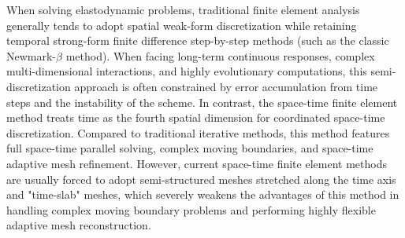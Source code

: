 \begin{abstractEn}
    When solving elastodynamic problems, traditional finite element analysis generally tends to adopt spatial weak-form discretization while retaining temporal strong-form finite difference step-by-step methods (such as the classic Newmark-$\beta$ method). When facing long-term continuous responses, complex multi-dimensional interactions, and highly evolutionary computations, this semi-discretization approach is often constrained by error accumulation from time steps and the instability of the scheme. In contrast, the space-time finite element method treats time as the fourth spatial dimension for coordinated space-time discretization. Compared to traditional iterative methods, this method features full space-time parallel solving, complex moving boundaries, and space-time adaptive mesh refinement. However, current space-time finite element methods are usually forced to adopt semi-structured meshes stretched along the time axis and "time-slab" meshes, which severely weakens the advantages of this method in handling complex moving boundary problems and performing highly flexible adaptive mesh reconstruction.


\end{abstractEn}
